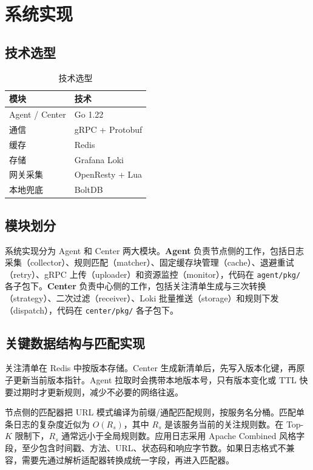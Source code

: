 \section{系统实现}

\subsection{技术选型}
\begin{table}[htbp]
  \centering
  \caption{技术选型}\label{tab:tech}
  \begin{tabular}{ll}
    \toprule
    模块 & 技术 \\
    \midrule
    Agent / Center & Go 1.22 \\
    通信 & gRPC + Protobuf \\
    缓存 & Redis \\
    存储 & Grafana Loki \\
    网关采集 & OpenResty + Lua \\
    本地兜底 & BoltDB \\
    \bottomrule
  \end{tabular}
\end{table}

\subsection{模块划分}
系统实现分为 Agent 和 Center 两大模块。\textbf{Agent} 负责节点侧的工作，包括日志采集（collector）、规则匹配（matcher）、固定缓存块管理（cache）、退避重试（retry）、gRPC 上传（uploader）和资源监控（monitor），代码在 \texttt{agent/pkg/} 各子包下。\textbf{Center} 负责中心侧的工作，包括关注清单生成与三次转换（strategy）、二次过滤（receiver）、Loki 批量推送（storage）和规则下发（dispatch），代码在 \texttt{center/pkg/} 各子包下。

\subsection{关键数据结构与匹配实现}
关注清单在 Redis 中按版本存储。Center 生成新清单后，先写入版本化键，再原子更新当前版本指针。Agent 拉取时会携带本地版本号，只有版本变化或 TTL 快要过期时才更新规则，减少不必要的网络往返。

节点侧的匹配器把 URL 模式编译为前缀/通配匹配规则，按服务名分桶。匹配单条日志的复杂度近似为 $O(R_s)$，其中 $R_s$ 是该服务当前的关注规则数。在 Top-$K$ 限制下，$R_s$ 通常远小于全局规则数。应用日志采用 Apache Combined 风格字段，至少包含时间戳、方法、URL、状态码和响应字节数。如果日志格式不兼容，需要先通过解析适配器转换成统一字段，再进入匹配器。


